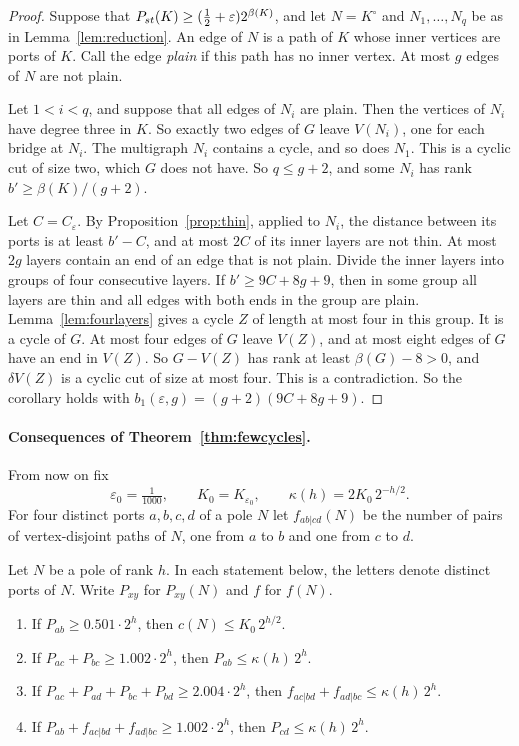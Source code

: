 \begin{proof}
Suppose that $P_{st}(K)\ge(\tfrac12+\varepsilon)2^{\beta(K)}$, and let $N=K^{\circ}$ and
$N_1,\dots,N_q$ be as in Lemma~\ref{lem:reduction}. An edge of $N$ is a path of $K$ whose inner
vertices are ports of $K$. Call the edge \emph{plain} if this path has no inner vertex. At most
$g$ edges of $N$ are not plain.

Let $1<i<q$, and suppose that all edges of $N_i$ are plain. Then the vertices of $N_i$ have degree
three in $K$. So exactly two edges of $G$ leave $V(N_i)$, one for each bridge at $N_i$. The
multigraph $N_i$ contains a cycle, and so does $N_1$. This is a cyclic cut of size two, which $G$
does not have. So $q\le g+2$, and some $N_i$ has rank $b'\ge\beta(K)/(g+2)$.

Let $C=C_\varepsilon$. By Proposition~\ref{prop:thin}, applied to $N_i$, the distance between its
ports is at least $b'-C$, and at most $2C$ of its inner layers are not thin. At most $2g$ layers
contain an end of an edge that is not plain. Divide the inner layers into groups of four
consecutive layers. If $b'\ge9C+8g+9$, then in some group all layers are thin and all edges with
both ends in the group are plain. Lemma~\ref{lem:fourlayers} gives a cycle $Z$ of length at most
four in this group. It is a cycle of $G$. At most four edges of $G$ leave $V(Z)$, and at most
eight edges of $G$ have an end in $V(Z)$. So $G-V(Z)$ has rank at least $\beta(G)-8>0$, and
$\delta V(Z)$ is a cyclic cut of size at most four. This is a contradiction. So the corollary
holds with $b_1(\varepsilon,g)=(g+2)(9C+8g+9)$.
\end{proof}

\paragraph{Consequences of Theorem~\ref{thm:fewcycles}.}
From now on fix
\[
  \varepsilon_0=\tfrac1{1000},\qquad K_0=K_{\varepsilon_0},\qquad\kappa(h)=2K_0\,2^{-h/2}.
\]
For four distinct ports $a,b,c,d$ of a pole $N$ let $f_{ab|cd}(N)$ be the number of pairs of
vertex-disjoint paths of $N$, one from $a$ to $b$ and one from $c$ to $d$.

\begin{lemma}\label{lem:gadgets}
Let $N$ be a pole of rank $h$. In each statement below, the letters denote distinct ports of $N$.
Write $P_{xy}$ for $P_{xy}(N)$ and $f$ for $f(N)$.
\begin{enumerate}
\item[\textup{(a)}] If $P_{ab}\ge0.501\cdot2^{h}$, then $c(N)\le K_0\,2^{h/2}$.
\item[\textup{(b)}] If $P_{ac}+P_{bc}\ge1.002\cdot2^{h}$, then $P_{ab}\le\kappa(h)\,2^{h}$.
\item[\textup{(c)}] If $P_{ac}+P_{ad}+P_{bc}+P_{bd}\ge2.004\cdot2^{h}$, then
$f_{ac|bd}+f_{ad|bc}\le\kappa(h)\,2^{h}$.
\item[\textup{(d)}] If $P_{ab}+f_{ac|bd}+f_{ad|bc}\ge1.002\cdot2^{h}$, then
$P_{cd}\le\kappa(h)\,2^{h}$.
\end{enumerate}
\end{lemma}

